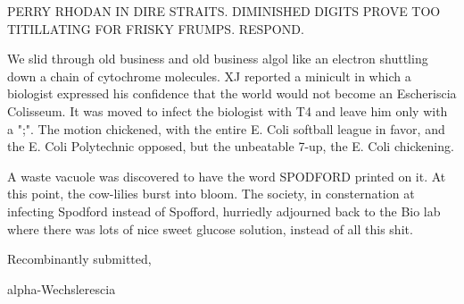 \documentclass[12pt]{article}
\begin{document}
PERRY RHODAN IN DIRE STRAITS. DIMINISHED DIGITS PROVE TOO TITILLATING FOR FRISKY FRUMPS. RESPOND.

We slid through old business and old business algol like an electron shuttling down a chain of cytochrome molecules. XJ reported a minicult in which a biologist expressed his confidence that the world would not become an Escheriscia Colisseum. It was moved to infect the biologist with T4 and leave him only with a ";". The motion chickened, with the entire E. Coli softball league in favor, and the E. Coli Polytechnic opposed, but the unbeatable 7-up, the E. Coli chickening.

A waste vacuole was discovered to have the word SPODFORD printed on it. At this point, the cow-lilies burst into bloom. The society, in consternation at infecting Spodford instead of Spofford, hurriedly adjourned back to the Bio lab where there was lots of nice sweet glucose solution, instead of all this shit.

\vspace{12pt}

\centerline{Recombinantly submitted,}
\centerline{alpha-Wechslerescia}
\end{document}
